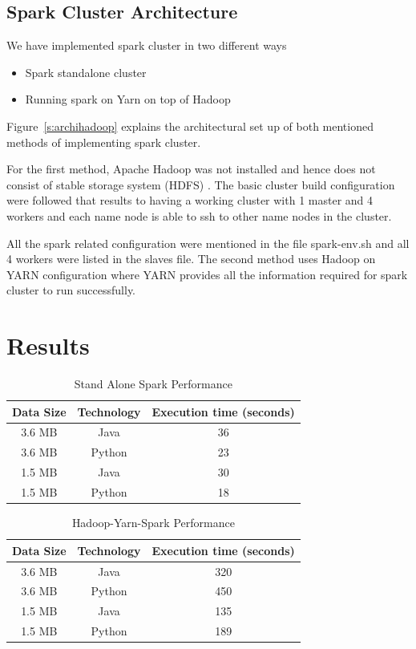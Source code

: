 \subsection{Spark Cluster Architecture}

We have implemented spark cluster in two different ways

\begin{itemize}

\item Spark standalone cluster
\item Running spark on Yarn on top of Hadoop

\end{itemize}

Figure~\ref{s:archihadoop} explains the architectural set up of both 
mentioned methods of implementing spark cluster.

For the first method, Apache Hadoop was not installed and hence does not consist
 of stable storage system (HDFS) . The basic cluster build configuration were 
 followed that results to having a working cluster with 1 master and 4 
 workers and each name node is able to ssh to other name nodes in the cluster. 

All the spark related configuration were mentioned in the file spark-env.sh and 
all 4 workers were listed in the slaves file.
The second method uses Hadoop on YARN configuration where YARN provides all the 
information required for spark cluster to run successfully.


\section{Results}

\begin{table}[hbt]
\centering
\caption{Stand Alone Spark Performance}\label{t:results-table}
    \begin{tabular}{ | c | c | c |}
    \hline
    Data Size & Technology & Execution time (seconds) \\ \hline
    3.6 MB & Java & 36 \\ \hline
    3.6 MB & Python & 23\\ \hline
    1.5 MB & Java & 30 \\ \hline
    1.5 MB & Python & 18 \\
    \hline
    \end{tabular}
\end{table}


\begin{table}[hbt]
\centering
\caption{Hadoop-Yarn-Spark Performance}\label{t:results-table2}
    \begin{tabular}{ | c | c | c |}
    \hline
    Data Size & Technology & Execution time (seconds) \\ \hline
    3.6 MB & Java &  320  \\ \hline
    3.6 MB & Python & 450 \\ \hline
    1.5 MB & Java & 135   \\ \hline
    1.5 MB & Python & 189 \\ 
    \hline
    \end{tabular} 
\end{table}


